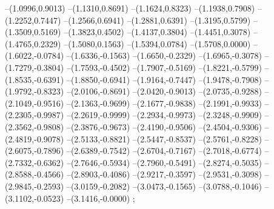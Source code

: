 {--(1.0996,0.9013)
--(1.1310,0.8691)
--(1.1624,0.8323)
--(1.1938,0.7908)
--(1.2252,0.7447)
--(1.2566,0.6941)
--(1.2881,0.6391)
--(1.3195,0.5799)
--(1.3509,0.5169)
--(1.3823,0.4502)
--(1.4137,0.3804)
--(1.4451,0.3078)
--(1.4765,0.2329)
--(1.5080,0.1563)
--(1.5394,0.0784)
--(1.5708,0.0000)
--(1.6022,-0.0784)
--(1.6336,-0.1563)
--(1.6650,-0.2329)
--(1.6965,-0.3078)
--(1.7279,-0.3804)
--(1.7593,-0.4502)
--(1.7907,-0.5169)
--(1.8221,-0.5799)
--(1.8535,-0.6391)
--(1.8850,-0.6941)
--(1.9164,-0.7447)
--(1.9478,-0.7908)
--(1.9792,-0.8323)
--(2.0106,-0.8691)
--(2.0420,-0.9013)
--(2.0735,-0.9288)
--(2.1049,-0.9516)
--(2.1363,-0.9699)
--(2.1677,-0.9838)
--(2.1991,-0.9933)
--(2.2305,-0.9987)
--(2.2619,-0.9999)
--(2.2934,-0.9973)
--(2.3248,-0.9909)
--(2.3562,-0.9808)
--(2.3876,-0.9673)
--(2.4190,-0.9506)
--(2.4504,-0.9306)
--(2.4819,-0.9078)
--(2.5133,-0.8821)
--(2.5447,-0.8537)
--(2.5761,-0.8228)
--(2.6075,-0.7896)
--(2.6389,-0.7542)
--(2.6704,-0.7167)
--(2.7018,-0.6774)
--(2.7332,-0.6362)
--(2.7646,-0.5934)
--(2.7960,-0.5491)
--(2.8274,-0.5035)
--(2.8588,-0.4566)
--(2.8903,-0.4086)
--(2.9217,-0.3597)
--(2.9531,-0.3098)
--(2.9845,-0.2593)
--(3.0159,-0.2082)
--(3.0473,-0.1565)
--(3.0788,-0.1046)
--(3.1102,-0.0523)
--(3.1416,-0.0000)
;}
